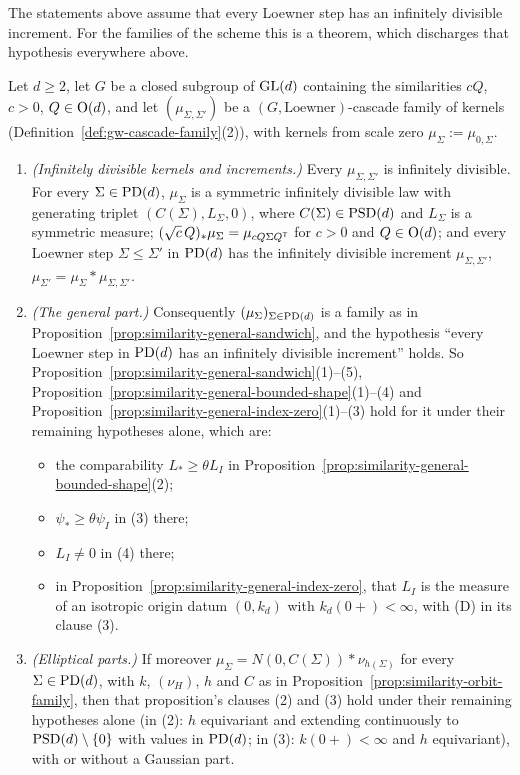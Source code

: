 The statements above assume that every Loewner step has an infinitely divisible increment. For the
families of the scheme this is a theorem, which discharges that hypothesis everywhere above.

\begin{proposition}\label{prop:similarity-cascade-families}
Let $d \ge 2$, let $G$ be a closed subgroup of $\mathrm{GL}(d)$ containing the similarities $cQ$, $c > 0$,
$Q \in \mathrm{O}(d)$, and let $(\mu_{\Sigma,\Sigma'})$ be a $(G, \text{Loewner})$-cascade family of kernels
(Definition~\ref{def:gw-cascade-family}(2)), with kernels from scale zero $\mu_\Sigma := \mu_{0,\Sigma}$.
\begin{enumerate}
\item \emph{(Infinitely divisible kernels and increments.)} Every $\mu_{\Sigma,\Sigma'}$ is infinitely divisible. For
every $\Sigma \in \mathrm{PD}(d)$, $\mu_\Sigma$ is a symmetric infinitely divisible law with generating triplet
$(C(\Sigma), L_\Sigma, 0)$, where $C(\Sigma) \in \mathrm{PSD}(d)$ and $L_\Sigma$ is a symmetric \Levy{} measure;
$(\sqrt c\,Q)_*\mu_\Sigma = \mu_{cQ\Sigma Q^{\mathsf{T}}}$ for $c > 0$ and $Q \in \mathrm{O}(d)$; and every Loewner
step $\Sigma \le \Sigma'$ in $\mathrm{PD}(d)$ has the infinitely divisible increment $\mu_{\Sigma,\Sigma'}$,
$\mu_{\Sigma'} = \mu_\Sigma * \mu_{\Sigma,\Sigma'}$.
\item \emph{(The general part.)} Consequently $(\mu_\Sigma)_{\Sigma \in \mathrm{PD}(d)}$ is a family as in
Proposition~\ref{prop:similarity-general-sandwich}, and the hypothesis ``every Loewner step in $\mathrm{PD}(d)$ has an
infinitely divisible increment'' holds. So Proposition~\ref{prop:similarity-general-sandwich}(1)--(5),
Proposition~\ref{prop:similarity-general-bounded-shape}(1)--(4) and Proposition~\ref{prop:similarity-general-index-zero}(1)--(3)
hold for it under their remaining hypotheses alone, which are:
\begin{itemize}
\item the comparability $L_* \ge \theta L_I$ in Proposition~\ref{prop:similarity-general-bounded-shape}(2);
\item $\psi_* \ge \theta\psi_I$ in (3) there;
\item $L_I \ne 0$ in (4) there;
\item in Proposition~\ref{prop:similarity-general-index-zero}, that $L_I$ is the \Levy{} measure of an isotropic
origin datum $(0, k_d)$ with $k_d(0{+}) < \infty$, with (D) in its clause (3).
\end{itemize}
\item \emph{(Elliptical parts.)} If moreover $\mu_\Sigma = N(0, C(\Sigma)) * \nu_{h(\Sigma)}$ for every
$\Sigma \in \mathrm{PD}(d)$, with $k$, $(\nu_H)$, $h$ and $C$ as in Proposition~\ref{prop:similarity-orbit-family}, then that
proposition's clauses (2) and (3) hold under their remaining hypotheses alone (in (2): $h$ equivariant and
extending continuously to $\mathrm{PSD}(d) \setminus \{0\}$ with values in $\mathrm{PD}(d)$; in (3): $k(0{+}) < \infty$
and $h$ equivariant), with or without a Gaussian part.
\end{enumerate}
\end{proposition}

